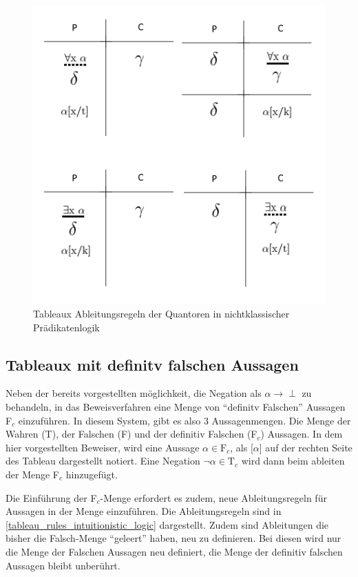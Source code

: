 \begin{figure}[h]
\begin{center}
\includegraphics[scale=0.7]{images/Tableaux_Quantors_IFOPL.png}
\caption{Tableaux Ableitungsregeln der Quantoren in nichtklassischer Prädikatenlogik}
\label{tableaux_quantors_ifopl}
\end{center}
\end{figure}

\subsection{\label{sec:intuitionistic_rules}Tableaux mit definitv falschen Aussagen}
Neben der bereits vorgestellten möglichkeit, die Negation als $\alpha\rightarrow\perp$ zu behandeln, in das Beweisverfahren eine Menge von ``definitv Falschen'' Aussagen F$_{c}$ einzuführen. In diesem System, gibt es also 3 Aussagenmengen. Die Menge der Wahren (T), der Falschen (F) und der definitiv Falschen (F$_{c}$) Aussagen. In dem hier vorgestellten Beweiser, wird eine Aussage $\alpha\in\textrm{F}_{c}$, als [$\alpha$] auf der rechten Seite des Tableau dargestellt notiert. Eine Negation $\neg\alpha\in\textrm{T}_{c}$ wird dann beim ableiten der Menge F$_{c}$ hinzugefügt. \cite{DGHP99}

Die Einführung der F$_{c}$-Menge erfordert es zudem, neue Ableitungsregeln für Aussagen in der Menge einzuführen. Die Ableitungsregeln sind in \autoref{tableau_rules_intuitionistic_logic} dargestellt. Zudem sind Ableitungen die bisher die Falsch-Menge ``geleert'' haben, neu zu definieren. Bei diesen wird nur die Menge der Falschen Aussagen neu definiert, die Menge der definitiv falschen Aussagen bleibt unberührt.


